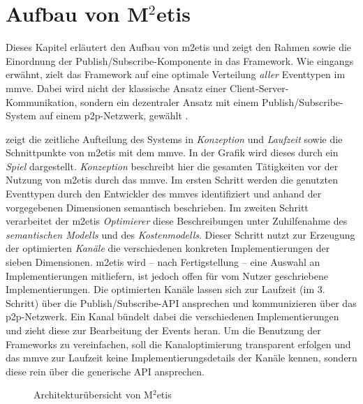 \section{Aufbau von M$^2$etis}
\label{chap:aufbau_metis}
Dieses Kapitel erläutert den Aufbau von \ac{m2etis} und zeigt den Rahmen sowie die Einordnung der Publish/Subscribe-Komponente in das Framework. Wie eingangs erwähnt, zielt das Framework auf eine optimale Verteilung \emph{aller} Eventtypen im \ac{mmve}. Dabei wird nicht der klassische Ansatz einer Client-Server-Kommunikation, sondern ein dezentraler Ansatz mit einem Publish/Subscribe-System auf einem \ac{p2p}-Netzwerk, gewählt \cite{Fischer2010a}.

 zeigt die zeitliche Aufteilung des Systems in \emph{Konzeption} und \emph{Laufzeit} sowie die Schnittpunkte von \ac{m2etis} mit dem \ac{mmve}. In der Grafik wird dieses durch ein \emph{Spiel} dargestellt. \emph{Konzeption} beschreibt hier die gesamten Tätigkeiten vor der Nutzung von \ac{m2etis} durch das \ac{mmve}. Im ersten Schritt werden die genutzten Eventtypen durch den Entwickler des \acp{mmve} identifiziert und anhand der vorgegebenen Dimensionen semantisch beschrieben. Im zweiten Schritt verarbeitet der \ac{m2etis} \emph{Optimierer} diese Beschreibungen unter Zuhilfenahme des \emph{semantischen Modells} und des \emph{Kostenmodells}. Dieser Schritt nutzt zur Erzeugung der optimierten \emph{Kanäle} die verschiedenen konkreten Implementierungen der sieben Dimensionen. \ac{m2etis} wird -- nach Fertigstellung -- eine Auswahl an Implementierungen mitliefern, ist jedoch offen für vom Nutzer geschriebene Implementierungen.
Die optimierten Kanäle lassen sich zur Laufzeit (im 3. Schritt) über die Publish/Subscribe-API ansprechen und kommunizieren über das \ac{p2p}-Netzwerk. Ein Kanal bündelt dabei die verschiedenen Implementierungen und zieht diese zur Bearbeitung der Events heran. Um die Benutzung der Frameworks zu vereinfachen, soll die Kanaloptimierung transparent erfolgen und das \ac{mmve} zur Laufzeit keine Implementierungsdetails der Kanäle kennen, sondern diese rein über die generische API ansprechen.


\begin{figure}[htbp]
\centering
{}
\caption{Architekturübersicht von M$^2$etis}
\label{fig:metis_aufbau}
\end{figure}


